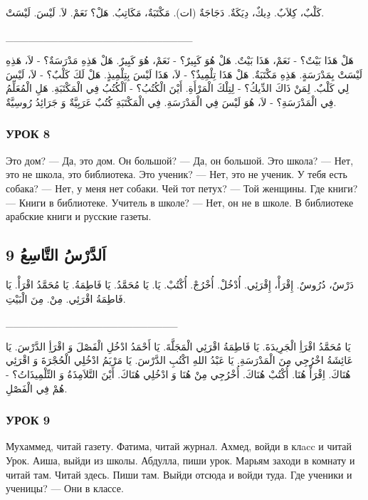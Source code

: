 \documentclass[a5paper]{article}
\begin{document}
كَلْبٌ، كِلاَبٌ. دِيكٌ، دِيَكَةٌ. دَجَاجَةٌ (ات). مَكْتَبَةٌ، مَكَاتِبُ. هَلْ؟ نَعَمْ. لاَ. لَيْسَ. لَيْسَتْ.

\_\_\_\_\_\_\_\_\_\_\_\_\_\_\_\_\_\_\_\_\_\_\_\_\_ 

هَلْ هَذَا بَيْتٌ؟ - نَعَمْ، هَذَا بَيْتٌ. هَلْ هُوَ كَبِيرٌ؟ - نَعَمْ، هُوَ كَبِيرٌ. هَلْ هَذِهِ مَدْرَسَةٌ؟ - لاَ، هَذِهِ لَيْسَتْ بِمَدْرَسَةٍ. هَذِهِ مَكْتَبَةٌ. هَلْ هَذَا تِلْمِيذٌ؟ - لاَ، هَذَا لَيْسَ بِتِلْمِيذٍ. هَلْ لَكَ كَلْبٌ؟ - لاَ، لَيْسَ لِي كَلْبٌ. لِمَنْ ذَاكَ الدِّيكُ؟ - لِتِلْكَ الْمَرْأَةِ. أَيْنَ الْكُتُبُ؟ - اَلْكُتُبُ فِي الْمَكْتَبَةِ. هَلِ الْمُعَلِّمُ فِي الْمَدْرَسَةِ؟ - لاَ، هُوَ لَيْسَ فِي الْمَدْرَسَةِ. فِي الْمَكْتَبَةِ كُتُبٌ عَرَبِيَّةٌ وَ جَرَائِدُ رُوسِيَّةٌ.

\subsubsection{УРОК 8}
Это дом? — Да, это дом. Он большой? — Да, он большой. Это школа? — Нет, это не школа, это библиотека. Это ученик? — Нет, это не ученик. У тебя есть собака? — Нет, у меня нет собаки. Чей тот петух? — Той женщины. Где книги? — Книги в библиотеке. Учитель в школе? — Нет, он не в школе. В библиотеке арабские книги и русские газеты.

\subsection{9 اَلدَّرْسُ التَّاسِعُ}
دَرْسٌ، دُرُوسٌ. إِقْرَأْ، إِقْرَئِي. أُدْخُلْ. أُخْرُجْ. أُكْتُبْ. يَا. يَا مُحَمَّدُ. يَا فَاطِمَةُ. يَا مُحَمَّدُ اقْرَأْ. يَا فَاطِمَةُ اقْرَئِي. مِنْ. مِنَ الْبَيْتِ.

\_\_\_\_\_\_\_\_\_\_\_\_\_\_\_\_\_\_\_\_\_\_\_ 

يَا مُحَمَّدُ اقْرَأِ الْجَرِيدَةَ. يَا فَاطِمَةُ اقْرَئِي الْمَجَلَّةَ. يَا أَحْمَدُ ادْخُلِ الْفَصْلَ وَ اقْرَأِ الدَّرْسَ. يَا عَائِشَةُ اخْرُجِي مِنَ الْمَدْرَسَةِ. يَا عَبْدُ اللهِ اكْتُبِ الدَّرْسَ. يَا مَرْيَمُ ادْخُلِي الْحُجْرَةَ وَ اقْرَئِي هُنَاكَ. اِقْرَأْ هُنَا. أُكْتُبْ هُنَاكَ. أُخْرُجِي مِنْ هُنَا وَ ادْخُلِي هُنَاكَ. أَيْنَ التَّلاَمِذَةُ وَ التِّلْمِيذَاتُ؟ - هُمْ فِي الْفَصْلِ.

\subsubsection{УРОК 9}
Мухаммед, читай газету. Фатима, читай журнал. Ахмед, войди в клacc и читай Урок. Аиша, выйди из школы. Абдулла, пиши урок. Марьям заходи в комнату и читай там. Читай здесь. Пиши там. Выйди отсюда и войди туда. Где ученики и ученицы? — Они в классе.
\end{document}
